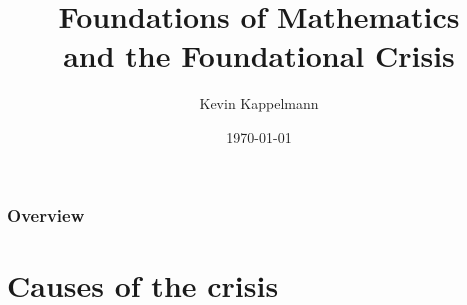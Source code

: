 \documentclass{beamer}
\title[Mathematical Foundations and the Foundational Crisis]{Foundations of Mathematics\\and the Foundational Crisis} %
\author{Kevin Kappelmann} %
\institute[TUM] %
{Technical University of Munich}
\date{\today} %
\begin{document}
\begin{frame}
\titlepage %
\end{frame}

\begin{frame}
    \frametitle{Overview} 
        \tableofcontents
\end{frame}
\section{Causes of the crisis}
\end{document}
